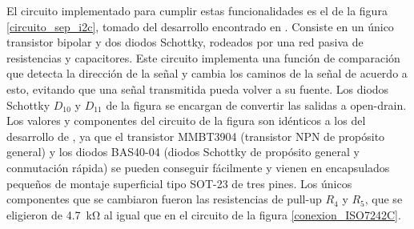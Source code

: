 El circuito implementado para cumplir estas funcionalidades es el de la figura \ref{circuito_sep_i2c}, tomado del desarrollo encontrado en \cite{I2C-ISO}. Consiste en un único transistor bipolar y dos diodos Schottky, rodeados por una red pasiva de resistencias y capacitores. Este circuito implementa una función de comparación que detecta la dirección de la señal y cambia los caminos de la señal de acuerdo a esto, evitando que una señal transmitida pueda volver a su fuente. Los diodos Schottky $D_{10}$ y $D_{11}$ de la figura se encargan de convertir las salidas a open-drain.\\

Los valores y componentes del circuito de la figura son idénticos a los del desarrollo de \cite{I2C-ISO}, ya que el transistor MMBT3904 (transistor NPN de propósito general) y los diodos BAS40-04 (diodos Schottky de propósito general y conmutación rápida) se pueden conseguir fácilmente y vienen en encapsulados pequeños de montaje superficial tipo SOT-23 de tres pines. Los únicos componentes que se cambiaron fueron las resistencias de pull-up $R_4$ y $R_5$, que se eligieron de \SI[]{4.7}[]{\kilo\ohm} al igual que en el circuito de la figura \ref{conexion_ISO7242C}.\\